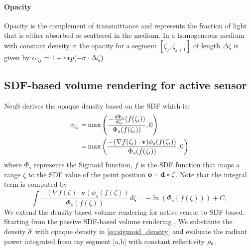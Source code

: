 \paragraph{Opacity}Opacity is the complement of transmittance and represents the fraction of light that is either absorbed or scattered in the medium. In a homogeneous medium with constant density $\sigma$  the opacity for a segment $[\zeta_j, \zeta_{j+1}]$ of length $\Delta \zeta$ is given by $\alpha_{\zeta_j} = 1 - exp(-\sigma \cdot \Delta \zeta)$
\subsection{SDF-based volume rendering for active sensor}\label{sec:sdf_active}
NeuS\cite{wang2021neus} derives the opaque density based on the SDF which is:
\begin{equation}
\begin{split}
\sigma_{\zeta_i} =&  \max\left(\frac{-\frac{d\Phi_s}{d\zeta_i}(f(\zeta_i))}{\Phi_s(f(\zeta_i))},0\right)\\
                  =& \max\left(\frac{-(\nabla f(\zeta_i)\cdot \mathbf{v})\phi_s(f(\zeta_i))}{\Phi_s(f(\zeta_i))}, 0\right)
\end{split}
\label{eq:sigmoid_density}
\end{equation}
where $\Phi_s$ represents the Sigmoid function, $f$ is the SDF function that maps a range $\zeta$ to the SDF value of the point position $\mathbf{o} + \mathbf{d} * \zeta$. Note that the integral term is computed by
\begin{equation}
\int \frac{-(\nabla f(\zeta)\cdot \mathbf{v})\phi_s(f(\zeta))}{\Phi_s(f(\zeta))}d\zeta = -\ln(\Phi_s(f(\zeta))) + C,
\label{eq:intergration_density}
\end{equation}
We extend the density-based volume rendering for active sensor to SDF-based. Starting from the passive SDF-based volume rendering \cite{wang2021neus}, We substitute the density $\tilde{\sigma}$ with opaque density in \ref{eq:sigmoid_density}
and evaluate the radiant power integrated from ray segment [a,b] with constant reflectivity $\rho_a$.

